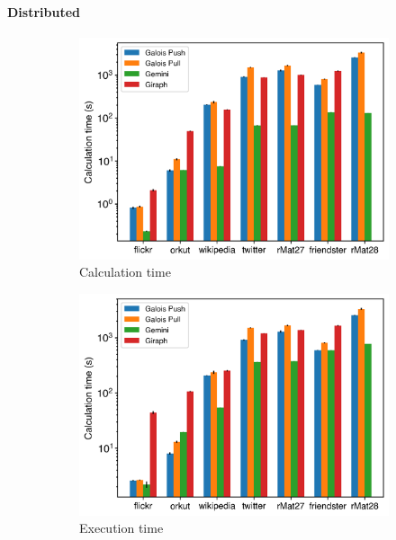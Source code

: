 \paragraph{Distributed}
\begin{figure}
	\hfil
	\begin{subfigure}{0.32\textwidth}
		\includegraphics[width=\linewidth]{../../plots/distributedPR_calcTime.png}
		\caption{Calculation time}
		\label{fig:distributedPR_calc}
	\end{subfigure}
	\hfil
	\begin{subfigure}{0.32\textwidth}
		\includegraphics[width=\linewidth]{../../plots/distributedPR_execTime.png}
		\caption{Execution time}
		\label{fig:distributedPR_exec}
	\end{subfigure}
	\hfil
	\begin{subfigure}{0.32\textwidth}

\end{subfigure}
\end{figure}
